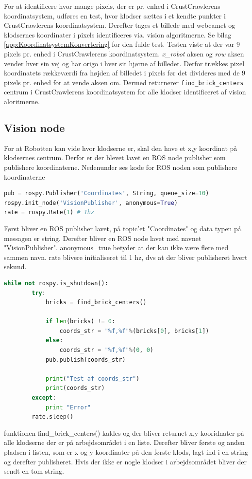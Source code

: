 
For at identificere hvor mange pixels, der er pr. enhed i CrustCrawlerens koordinatsystem, udføres en test, hvor klodser sættes i et kendte punkter i CrustCrawlerens koordinatsystem.
Derefter tages et billede med webcamet og klodsernes koordinater i pixels identificeres via. vision algoritmerne.
Se bilag \vref{app:KoordinatsystemKonvertering} for den fulde test.
Testen viste at der var 9 pixels pr. enhed i CrustCrawlerens koordinatsystem.
\textit{x\_robot} aksen og \textit{row} aksen vender hver sin vej og har origo i hver sit hjørne af billedet.
Derfor trækkes pixel koordinatets rækkeværdi fra højden af billedet i pixels før det divideres med de 9 pixels pr. enhed for at vende aksen om.
Dermed returnerer \texttt{find\_brick\_centers} centrum i CrustCrawlerens koordinatsystem for alle klodser identificeret af vision aloritmerne.

\subsection{Vision node}
For at Robotten kan vide hvor klodserne er, skal den have et x,y koordinat på klodsernes centrum.
Derfor er der blevet lavet en ROS node publisher som publishere koordinaterne.
Nedenunder ses kode for ROS noden som publishere koordinaterne \newline
\begin{lstlisting}[language=python]
pub = rospy.Publisher('Coordinates', String, queue_size=10)
rospy.init_node('VisionPublisher', anonymous=True)
rate = rospy.Rate(1) # 1hz
\end{lstlisting}
Først bliver en ROS publisher lavet, på topic'et "Coordinates" og data typen på messagen er string.
Derefter bliver en ROS node lavet med navnet "VisionPublisher". anonymous=true betyder at der kan ikke være flere med sammen navn.
rate blivere initialiseret til 1 hz, dvs at der bliver publisheret hvert sekund. \newline
\begin{lstlisting}[language=python]
while not rospy.is_shutdown():
        try:
            bricks = find_brick_centers()
            
            if len(bricks) != 0:        
                coords_str = "%f,%f"%(bricks[0], bricks[1])
            else:
                coords_str = "%f,%f"%(0, 0)          
            pub.publish(coords_str)
            
            print("Test af coords_str")
            print(coords_str)
        except:
            print "Error"
        rate.sleep()
\end{lstlisting}
funktionen find_brick_centers() kaldes og der bliver returnet x,y kooridnater på alle klodserne der er på arbejdsområdet i en liste.
Derefter bliver første og anden pladsen i listen, som er x og y koordinater på den første klods, lagt ind i en string og derefter publisheret.
Hvis der ikke er nogle klodser i arbejdsområdet bliver der sendt en tom string.


